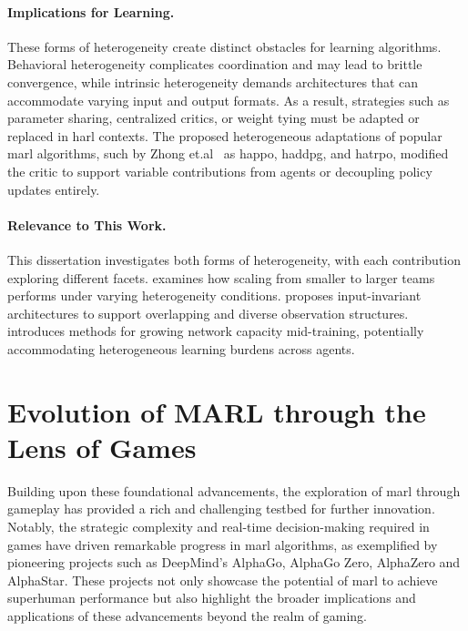\paragraph{Implications for Learning.}
These forms of heterogeneity create distinct obstacles for learning algorithms. 
Behavioral heterogeneity complicates coordination and may lead to brittle convergence, 
while intrinsic heterogeneity demands architectures that can accommodate 
varying input and output formats. As a result, strategies such as parameter sharing, 
centralized critics, or weight tying must be adapted or replaced in \gls{harl} contexts. 
The proposed heterogeneous adaptations of popular \gls{marl} algorithms, 
such by Zhong et.al~\cite{zhong2024} as \gls{happo}, \gls{haddpg}, and \gls{hatrpo}, 
modified the critic to support variable contributions from agents or 
decoupling policy updates entirely.

\paragraph{Relevance to This Work.}
This dissertation investigates both forms of heterogeneity, 
with each contribution exploring different facets. 
 examines how scaling from smaller to 
larger teams performs under varying heterogeneity conditions. 
 proposes input-invariant architectures 
to support overlapping and diverse observation structures. 
 introduces methods for growing network capacity 
mid-training, potentially accommodating heterogeneous learning burdens across agents.

\section{Evolution of MARL through the Lens of Games}%

Building upon these foundational advancements, the exploration of \gls{marl} 
through gameplay has provided a rich and challenging testbed for further 
innovation. Notably, the strategic complexity and real-time decision-making 
required in games have driven remarkable progress in \gls{marl} algorithms, 
as exemplified by pioneering projects such as 
DeepMind's AlphaGo\cite{silver2016}, AlphaGo Zero\cite{silver2017},
AlphaZero\cite{silver2017a} and AlphaStar\cite{vinyals2019}. 
These projects not only showcase the potential of \gls{marl} to 
achieve superhuman performance but also highlight the broader implications 
and applications of these advancements beyond the realm of gaming.


